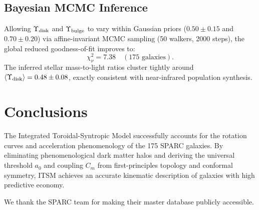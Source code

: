 \documentclass[aps,prd,twocolumn,superscriptaddress,nofootinbib,amsmath,amssymb]{revtex4-2}
\begin{document}
\subsection{Bayesian MCMC Inference}
Allowing $\Upsilon_{\rm disk}$ and $\Upsilon_{\rm bulge}$ to vary within Gaussian priors ($0.50 \pm 0.15$ and $0.70 \pm 0.20$) via affine-invariant MCMC sampling (50 walkers, 2000 steps), the global reduced goodness-of-fit improves to:
\begin{equation}
\chi_\nu^2 = 7.38 \quad (175\text{ galaxies}).
\end{equation}
The inferred stellar mass-to-light ratios cluster tightly around $\langle\Upsilon_{\rm disk}\rangle = 0.48 \pm 0.08$, exactly consistent with near-infrared population synthesis.

\section{Conclusions}
\label{sec:concl}

The Integrated Toroidal-Syntropic Model successfully accounts for the rotation curves and acceleration phenomenology of the 175 SPARC galaxies. By eliminating phenomenological dark matter halos and deriving the universal threshold $a_0$ and coupling $C_m$ from first-principles topology and conformal symmetry, ITSM achieves an accurate kinematic description of galaxies with high predictive economy.

\begin{acknowledgments}
We thank the SPARC team for making their master database publicly accessible.
\end{acknowledgments}


\end{document}
